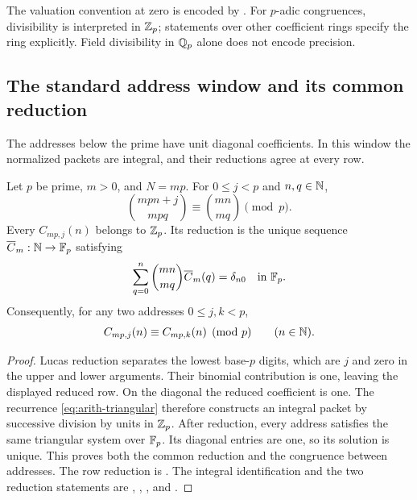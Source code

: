 The valuation convention at zero is encoded by
.  For $p$-adic
congruences, divisibility is interpreted in $\mathbb Z_p$; statements over other
coefficient rings specify the ring explicitly.  Field divisibility in
$\mathbb Q_p$ alone does not encode precision.

\subsection{The standard address window and its common reduction}

The addresses below the prime have unit diagonal coefficients.  In this
window the normalized packets are integral, and their reductions agree
at every row.

\begin{proposition}
\label{prop:arith-lucas-window}
Let $p$ be prime, $m>0$, and $N=mp$.  For $0\le j<p$ and $n,q\in\mathbb N$,
\[
 \binom{mpn+j}{mpq}\equiv\binom{mn}{mq}\pmod p.
\]
Every $C_{mp,j}(n)$ belongs to $\mathbb Z_p$.  Its reduction is the unique
sequence $\overline C_m:\mathbb N\to\mathbb F_p$ satisfying
\[
 \sum_{q=0}^{n}\binom{mn}{mq}\overline C_m(q)=\delta_{n0}
 \quad\text{in }\mathbb F_p.
\]
Consequently, for any two addresses $0\le j,k<p$,
\[
 C_{mp,j}(n)\equiv C_{mp,k}(n)\pmod p\qquad(n\in\mathbb N).
\]
\end{proposition}

\begin{proof}
Lucas reduction separates the lowest base-$p$ digits, which are $j$ and
zero in the upper and lower arguments.  Their binomial contribution is
one, leaving the displayed reduced row.  On the diagonal the reduced
coefficient is one.  The recurrence \eqref{eq:arith-triangular} therefore
constructs an integral packet by successive division by units in $\mathbb Z_p$.
After reduction, every address satisfies the same triangular system over
$\mathbb F_p$.  Its diagonal entries are one, so its solution is unique.  This
proves both the common reduction and the congruence between addresses.
The row reduction is
.
The integral identification and the two reduction statements are
,
,
, and
.
\end{proof}


